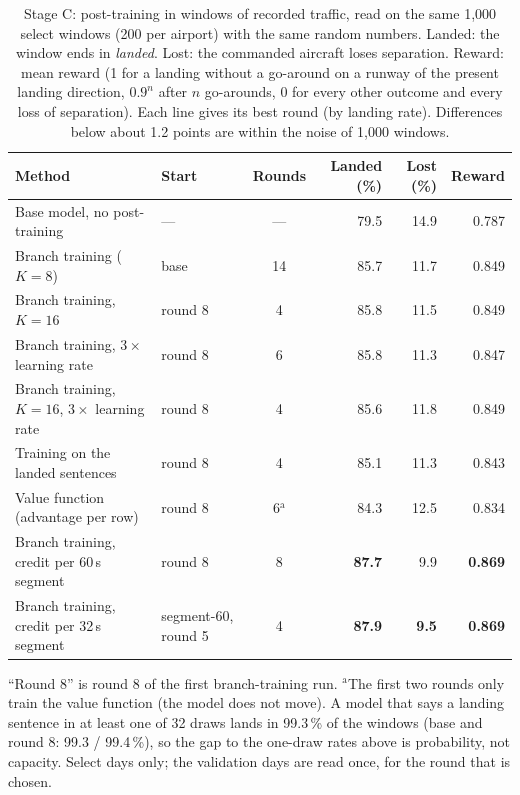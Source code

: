 \begin{table}[t]
\centering
\caption{Stage C: post-training in windows of recorded traffic, read on the same 1{,}000 select windows (200 per airport)
with the same random numbers. Landed: the window ends in \emph{landed}. Lost: the commanded aircraft loses separation.
Reward: mean reward (1 for a landing without a go-around on a runway of the present landing direction, $0.9^n$ after $n$
go-arounds, 0 for every other outcome and every loss of separation). Each line gives its best round (by landing rate).
Differences below about 1.2 points are within the noise of 1{,}000 windows.}
\label{tab:result-stage-c}
\small
\renewcommand{\arraystretch}{1.2}
\begin{tabularx}{\textwidth}{@{}>{\raggedright\arraybackslash}X l c rrr@{}}
\toprule
Method & Start & Rounds & Landed (\%) & Lost (\%) & Reward \\
\midrule
Base model, no post-training          & ---       & ---  & 79.5 & 14.9 & 0.787 \\
\midrule
Branch training ($K{=}8$)             & base      & 14   & 85.7 & 11.7 & 0.849 \\
Branch training, $K{=}16$             & round 8   & 4    & 85.8 & 11.5 & 0.849 \\
Branch training, $3\times$ learning rate & round 8 & 6    & 85.8 & 11.3 & 0.847 \\
Branch training, $K{=}16$, $3\times$ learning rate & round 8 & 4 & 85.6 & 11.8 & 0.849 \\
Training on the landed sentences      & round 8   & 4    & 85.1 & 11.3 & 0.843 \\
Value function (advantage per row)    & round 8   & 6$^{\mathrm{a}}$ & 84.3 & 12.5 & 0.834 \\
Branch training, credit per 60\,s segment & round 8 & 8  & \textbf{87.7} & 9.9 & \textbf{0.869} \\
Branch training, credit per 32\,s segment & segment-60, round 5 & 4 & \textbf{87.9} & \textbf{9.5} & \textbf{0.869} \\
\bottomrule
\end{tabularx}

\vspace{0.3em}
\begin{minipage}{\textwidth}
\footnotesize
``Round 8'' is round 8 of the first branch-training run. $^{\mathrm{a}}$The first two rounds only train the value function
(the model does not move). A model that says a landing sentence in at least one of 32 draws lands in 99.3\,\% of the windows
(base and round 8: 99.3 / 99.4\,\%), so the gap to the one-draw rates above is probability, not capacity. Select days only;
the validation days are read once, for the round that is chosen.
\end{minipage}
\end{table}
